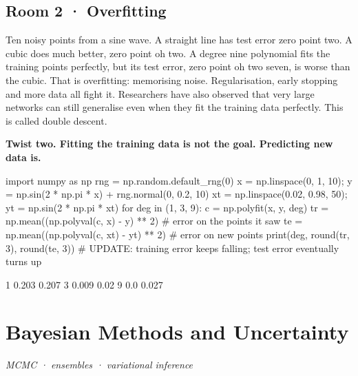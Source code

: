\documentclass[11pt,a4paper]{report}
\begin{document}
\section*{Room 2 · Overfitting}
Ten noisy points from a sine wave. A straight line has test error zero point two. A cubic does much better, zero point oh two. A degree nine polynomial fits the training points perfectly, but its test error, zero point oh two seven, is worse than the cubic. That is overfitting: memorising noise. Regularisation, early stopping and more data all fight it. Researchers have also observed that very large networks can still generalise even when they fit the training data perfectly. This is called double descent.
\begin{tcolorbox}[colback=yellow!12,colframe=orange!70!black,boxrule=0.4pt,left=4pt,right=4pt,top=2pt,bottom=2pt]\textbf{Twist two. Fitting the training data is not the goal. Predicting new data is.}\end{tcolorbox}
\begin{Code}
import numpy as np
rng = np.random.default_rng(0)
x = np.linspace(0, 1, 10); y = np.sin(2 * np.pi * x) + rng.normal(0, 0.2, 10)
xt = np.linspace(0.02, 0.98, 50); yt = np.sin(2 * np.pi * xt)
for deg in (1, 3, 9):
    c = np.polyfit(x, y, deg)
    tr = np.mean((np.polyval(c, x) - y) ** 2)      # error on the points it saw
    te = np.mean((np.polyval(c, xt) - yt) ** 2)    # error on new points
    print(deg, round(tr, 3), round(te, 3))
# UPDATE: training error keeps falling; test error eventually turns up
\end{Code}
\begin{Out}
1 0.203 0.207
3 0.009 0.02
9 0.0 0.027
\end{Out}
\chapter{Bayesian Methods and Uncertainty}
\textit{MCMC · ensembles · variational inference}
\end{document}
